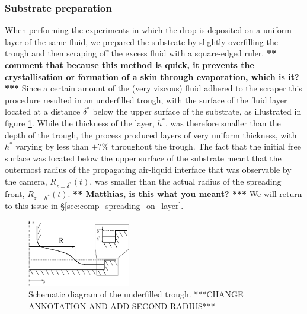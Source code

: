 \documentclass[aip,graphicx]{revtex4-1}
\begin{document}
\subsubsection{Substrate preparation\label{sec:creating_layer}}
When performing the experiments in which the drop is 
deposited on a uniform layer of the same fluid, we prepared the
substrate by slightly overfilling the trough and then scraping
off the excess fluid with a square-edged ruler.  {\bf  *** comment that because this method is quick, it prevents the crystallisation or formation of a skin through evaporation, which is it? ***} Since a certain amount of the (very viscous) fluid 
adhered to the scraper this procedure resulted in an underfilled trough, 
with the surface of the fluid layer located at a distance $\delta^*$ 
below the upper surface of the substrate, as illustrated in figure 
\ref{fig:axisym_drop_nozzle_gap}. While the thickness of the layer, 
$h^*$, was therefore smaller than the depth of the trough, the
process produced layers of very uniform thickness, with
$h^*$ varying by less than {\bf $\pm ?\%$} throughout the trough. 
The fact that the initial free surface was located below the
upper surface of the substrate meant that the outermost radius
of the propagating air-liquid interface that was observable by the camera,
$R_{z=\delta^*}(t)$, was smaller than the actual radius of the spreading front,
 $R_{z=h^*}(t)$. {\bf *** Matthias, is this what you meant? ***} We will return to this issue in \S \ref{sec:comp_spreading_on_layer}.

\begin{figure}[!ht]
\centering
\includegraphics[width=0.4\textwidth]{figures/axisym_drop_nozzle_gap.eps}
\caption{Schematic diagram of the underfilled trough. ***CHANGE
  ANNOTATION AND ADD SECOND RADIUS***}
\label{fig:axisym_drop_nozzle_gap}
\end{figure}
 
\end{document}
